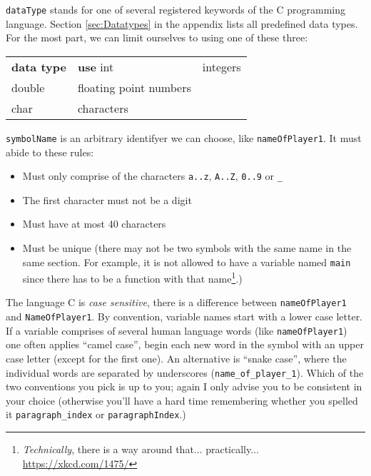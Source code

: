 \texttt{dataType} stands for one of several registered keywords of the C programming language. Section \ref{sec:Datatypes} in the appendix lists all predefined data types. For the most part, we can limit ourselves to using one of these three:
\begin{center}

\begin{tabularx}
	{.5505\linewidth}
	{TU}
\toprule[1.5pt]
	\textbf{\textrm{data type}} & \textbf{use} \tabcrlf
	int                         & integers \\
	double                      & floating point numbers \\
	char                        & characters \\
\bottomrule[1.5pt]
\end{tabularx}
\end{center}

\texttt{symbolName} is an arbitrary identifyer we can choose, like \texttt{nameOfPlayer1}. It must abide to these rules:
\begin{itemize}
\item Must only comprise of the characters \texttt{a..z}, \texttt{A..Z}, \texttt{0..9} or \texttt{\_}
\item The first character must not be a digit
\item Must have at most 40 characters
\item Must be unique (there may not be two symbols with the same name in the same section. For example, it is not allowed to have a variable named \texttt{main} 
	since there has to be a function with that name\footnote{\emph{Technically}, there is a way around that... practically... \url{https://xkcd.com/1475/}}.)
\end{itemize}
The language C is \emph{case sensitive}, \ie there is a difference between \texttt{nameOfPlayer1} and \texttt{NameOfPlayer1}. By convention, variable names start with a lower case letter. If a variable comprises of several human language words (like \texttt{nameOfPlayer1}) one often applies \enquote{camel case}, \ie begin each new word in the symbol with an upper case letter (except for the first one). An alternative is \enquote{snake case}, where the individual words are separated by underscores (\texttt{name\_of\_player\_1}). Which of the two conventions you pick is up to you; again I only advise you to be consistent in your choice (otherwise you'll have a hard time remembering whether you spelled it \texttt{paragraph\_index} or \texttt{paragraphIndex}.)

